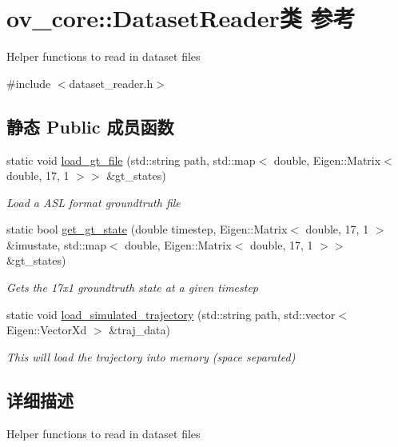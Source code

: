 \hypertarget{classov__core_1_1DatasetReader}{}\section{ov\+\_\+core\+:\+:Dataset\+Reader类 参考}
\label{classov__core_1_1DatasetReader}


Helper functions to read in dataset files  




{\ttfamily \#include $<$dataset\+\_\+reader.\+h$>$}

\subsection*{静态 Public 成员函数}
\begin{DoxyCompactItemize}
\item 
static void \hyperlink{classov__core_1_1DatasetReader_a948c021c3e3d80afe6a7248fd8423104}{load\+\_\+gt\+\_\+file} (std\+::string path, std\+::map$<$ double, Eigen\+::\+Matrix$<$ double, 17, 1 $>$$>$ \&gt\+\_\+states)
\begin{DoxyCompactList}\small\item\em Load a A\+SL format groundtruth file \end{DoxyCompactList}\item 
static bool \hyperlink{classov__core_1_1DatasetReader_af7827150c03a1871d5211764699ef0eb}{get\+\_\+gt\+\_\+state} (double timestep, Eigen\+::\+Matrix$<$ double, 17, 1 $>$ \&imustate, std\+::map$<$ double, Eigen\+::\+Matrix$<$ double, 17, 1 $>$$>$ \&gt\+\_\+states)
\begin{DoxyCompactList}\small\item\em Gets the 17x1 groundtruth state at a given timestep \end{DoxyCompactList}\item 
static void \hyperlink{classov__core_1_1DatasetReader_accb2a66a6468edf517c254aaa2e691d4}{load\+\_\+simulated\+\_\+trajectory} (std\+::string path, std\+::vector$<$ Eigen\+::\+Vector\+Xd $>$ \&traj\+\_\+data)
\begin{DoxyCompactList}\small\item\em This will load the trajectory into memory (space separated) \end{DoxyCompactList}\end{DoxyCompactItemize}


\subsection{详细描述}
Helper functions to read in dataset files 

